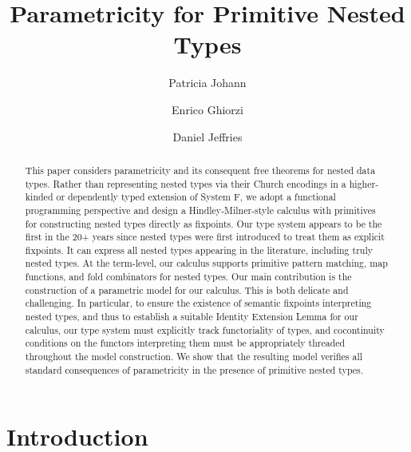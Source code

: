 \documentclass[runningheads]{llncs}
\begin{document}

\title{Parametricity for Primitive Nested Types\vspace*{-0.2in}} 
\author{Patricia Johann \and Enrico Ghiorzi \and Daniel
  Jeffries\vspace*{-0.12in}} 

\maketitle

\begin{abstract}

\vspace*{-0.25in}

This paper considers parametricity and its consequent free theorems
for nested data types. Rather than representing nested types via their
Church encodings in a higher-kinded or dependently typed extension of
System F, we adopt a functional programming perspective and design a
Hindley-Milner-style calculus with primitives for constructing nested
types directly as fixpoints. Our type system appears to be the first
in the 20+ years since nested types were first introduced to treat
them as explicit fixpoints. It can express all nested types appearing
in the literature, including truly nested types. At the term-level,
our calculus supports primitive pattern matching, map functions, and
fold combinators for nested types. Our main contribution is the
construction of a parametric model for our calculus. This is both
delicate and challenging. In particular, to ensure the existence of
semantic fixpoints interpreting nested types, and thus to establish a
suitable Identity Extension Lemma for our calculus, our type system
must explicitly track functoriality of types, and cocontinuity
conditions on the functors interpreting them must be appropriately
threaded throughout the model construction. We show that the
resulting model verifies all standard consequences of parametricity in
the presence of primitive nested types.
\end{abstract}

\vspace*{-0.4in}

\section{Introduction}\label{sec:intro}
\end{document}
